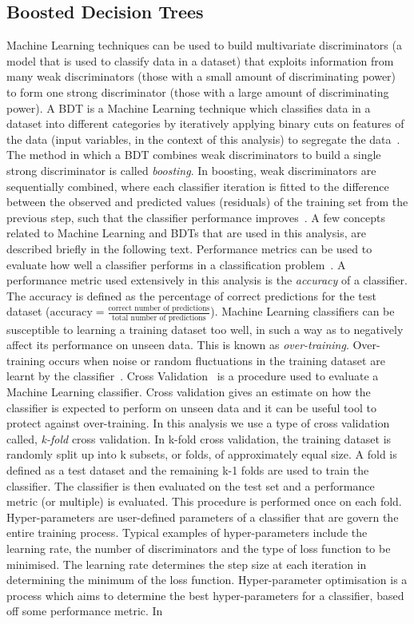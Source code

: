 \subsection{Boosted Decision Trees}
\label{sec:bdt}
Machine Learning techniques can be used to build multivariate discriminators (a model that is used to classify data in a dataset) that exploits information from many weak discriminators (those with a small amount of discriminating power) to form one strong discriminator (those with a large amount of discriminating power). A BDT is a Machine Learning technique which classifies data in a dataset into different categories by iteratively applying binary cuts on features of the data (input variables, in the context of this analysis) to segregate the data~\cite{intro-bdt}. The method in which a BDT combines weak discriminators to build a single strong discriminator is called \textit{boosting}. In boosting, weak discriminators are sequentially combined, where each classifier iteration is fitted to the difference between the observed and predicted values (residuals) of the training set from the previous step, such that the classifier performance improves~\cite{hastie2009the}. A few concepts related to Machine Learning and BDTs that are used in this analysis, are described briefly in the following text. Performance metrics can be used to evaluate how well a classifier performs in a classification problem~\cite{ML-metrics}. A performance metric used extensively in this analysis is the \textit{accuracy} of a classifier. The accuracy is defined as the percentage of correct predictions for the test dataset ($\text{accuracy} = \frac{\text{correct number of predictions}}{\text{total number of predictions}}$). Machine Learning classifiers can be susceptible to learning a training dataset too well, in such a way as to negatively affect its performance on unseen data. This is known as \textit{over-training}. Over-training occurs when noise or random fluctuations in the training dataset are learnt by the classifier~\cite{overfitting-blog}. Cross Validation~\cite{cv-blog} is a procedure used to evaluate a Machine Learning classifier. Cross validation gives an estimate on how the classifier is expected to perform on unseen data and it can be useful tool to protect against over-training. In this analysis we use a type of cross validation called, \textit{k-fold} cross validation. In k-fold cross validation, the training dataset is randomly split up into k subsets, or folds, of approximately equal size. A fold is defined as a test dataset and the remaining k-1 folds are used to train the classifier. The classifier is then evaluated on the test set and a performance metric (or multiple) is evaluated. This procedure is performed once on each fold. Hyper-parameters are user-defined parameters of a classifier that are govern the entire training process. Typical examples of hyper-parameters include the learning rate, the number of discriminators and the type of loss function to be minimised. The learning rate determines the step size at each iteration in determining the minimum of the loss function. Hyper-parameter optimisation is a process which aims to determine the best hyper-parameters for a classifier, based off some performance metric. In 